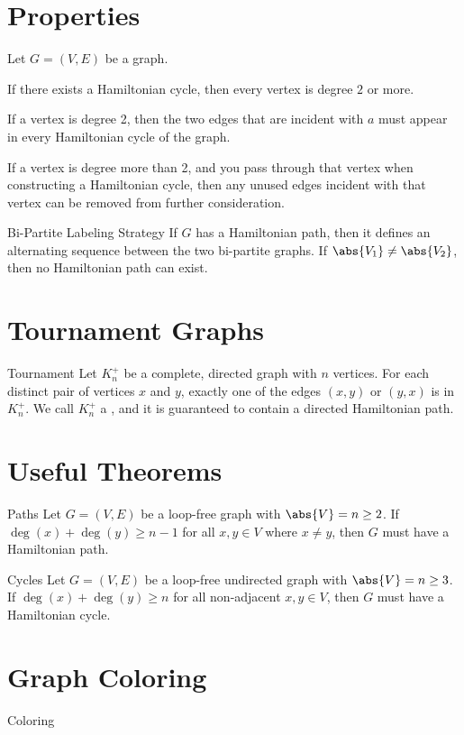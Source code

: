 \documentclass[12pt]{report}
\begin{document}
\section{Properties}
Let $G = (V,E)$ be a graph.
\begin{dfnitems}
	\item If there exists a Hamiltonian cycle, then every vertex is degree $2$ or more.
	\item If a vertex is degree 2, then the two edges that are incident with $a$ must appear in every Hamiltonian cycle of the graph.
	\item If a vertex is degree more than 2, and you pass through that vertex when constructing a Hamiltonian cycle, then any unused edges incident with that vertex can be removed from further consideration.
\end{dfnitems}

\begin{genbox}{Bi-Partite Labeling Strategy}
	If $G$ has a Hamiltonian path, then it defines an alternating sequence between the two bi-partite graphs. If $\abs{V_1} \neq \abs{V_2}$, then no Hamiltonian path can exist.
\end{genbox}

\section{Tournament Graphs}
\begin{dfnbox}{Tournament}
	Let $K_n^+$ be a complete, directed graph with $n$ vertices. For each distinct pair of vertices $x$ and $y$, exactly one of the edges $(x, y)$ or $(y,x)$ is in $K_n^+$. We call $K_n^+$ a , and it is guaranteed to contain a directed Hamiltonian path.
\end{dfnbox}

\section{Useful Theorems}
\begin{thmbox}{Paths}
	Let $G = (V, E)$ be a loop-free graph with $\abs{V} = n \geq 2$. If $\deg(x) + \deg(y) \geq n-1$ for all $x, y \in V$ where $x \neq y$, then $G$ must have a Hamiltonian path.
\end{thmbox}

\begin{thmbox}{Cycles}
	Let $G = (V,E)$ be a loop-free undirected graph with $\abs{V} = n \geq 3$. If $\deg(x) + \deg(y) \geq n$ for all non-adjacent $x,y \in V$, then $G$ must have a Hamiltonian cycle.
\end{thmbox}

\section{Graph Coloring}
\begin{dfnbox}{Coloring}
	
\end{dfnbox}
\end{document}
